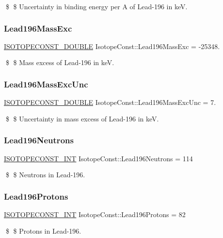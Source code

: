 \$ \$ Uncertainty in binding energy per A of Lead-\/196 in keV. \mbox{\label{group___isotope_const-_lead-_pb196_ga810b2b335338f0df3ed9de170e25f18a}} 
\subsubsection{\texorpdfstring{Lead196\+Mass\+Exc}{Lead196MassExc}}
{\footnotesize\ttfamily \mbox{\hyperlink{group___isotope_const-_macros_ga8f45a7272ce02c0b4c65c44636ed719a}{I\+S\+O\+T\+O\+P\+E\+C\+O\+N\+S\+T\+\_\+\+D\+O\+U\+B\+LE}} Isotope\+Const\+::\+Lead196\+Mass\+Exc = -\/25348.}

\$ \$ Mass excess of Lead-\/196 in keV. \mbox{\label{group___isotope_const-_lead-_pb196_gaf8f5f4f2b8bee8f2eeaa684cc670f2a0}} 
\subsubsection{\texorpdfstring{Lead196\+Mass\+Exc\+Unc}{Lead196MassExcUnc}}
{\footnotesize\ttfamily \mbox{\hyperlink{group___isotope_const-_macros_ga8f45a7272ce02c0b4c65c44636ed719a}{I\+S\+O\+T\+O\+P\+E\+C\+O\+N\+S\+T\+\_\+\+D\+O\+U\+B\+LE}} Isotope\+Const\+::\+Lead196\+Mass\+Exc\+Unc = 7.}

\$ \$ Uncertainty in mass excess of Lead-\/196 in keV. \mbox{\label{group___isotope_const-_lead-_pb196_ga68f2f3db05ceefa40b5134aea4754cab}} 
\subsubsection{\texorpdfstring{Lead196\+Neutrons}{Lead196Neutrons}}
{\footnotesize\ttfamily \mbox{\hyperlink{group___isotope_const-_macros_ga5f18360b3e99483a35c32d789e62621c}{I\+S\+O\+T\+O\+P\+E\+C\+O\+N\+S\+T\+\_\+\+I\+NT}} Isotope\+Const\+::\+Lead196\+Neutrons = 114}

\$ \$ Neutrons in Lead-\/196. \mbox{\label{group___isotope_const-_lead-_pb196_ga2fae4b5e7a853d23e4fc4617240c76b9}} 
\subsubsection{\texorpdfstring{Lead196\+Protons}{Lead196Protons}}
{\footnotesize\ttfamily \mbox{\hyperlink{group___isotope_const-_macros_ga5f18360b3e99483a35c32d789e62621c}{I\+S\+O\+T\+O\+P\+E\+C\+O\+N\+S\+T\+\_\+\+I\+NT}} Isotope\+Const\+::\+Lead196\+Protons = 82}

\$ \$ Protons in Lead-\/196. 
